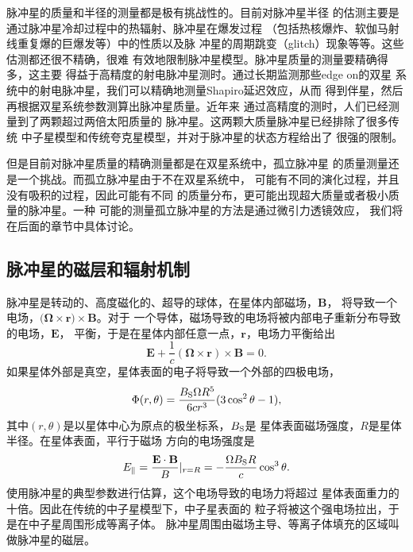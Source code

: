 脉冲星的质量和半径的测量都是极有挑战性的。目前对脉冲星半径
的估测主要是通过脉冲星冷却过程中的热辐射、脉冲星在爆发过程
（包括热核爆炸、软伽马射线重复爆的巨爆发等）中的性质以及脉
冲星的周期跳变（glitch）现象等等。这些估测都还很不精确，很难
有效地限制脉冲星模型。脉冲星质量的测量要精确得多，这主要
得益于高精度的射电脉冲星测时。通过长期监测那些edge on的双星
系统中的射电脉冲星，我们可以精确地测量Shapiro延迟效应，从而
得到伴星，然后再根据双星系统参数测算出脉冲星质量。近年来
通过高精度的测时，人们已经测量到了两颗超过两倍太阳质量的
脉冲星\supercite{Anton,Demorest}。这两颗大质量脉冲星已经排除了很多传统
中子星模型和传统夸克星模型，并对于脉冲星的状态方程给出了
很强的限制\supercite{Ozel2010,Lai2011}。

但是目前对脉冲星质量的精确测量都是在双星系统中，孤立脉冲星
的质量测量还是一个挑战。而孤立脉冲星由于不在双星系统中，
可能有不同的演化过程，并且没有吸积的过程，因此可能有不同
的质量分布，更可能出现超大质量或者极小质量的脉冲星。一种
可能的测量孤立脉冲星的方法是通过微引力透镜效应\supercite{Dai,dsl+15}，
我们将在后面的章节中具体讨论。

\subsection{脉冲星的磁层和辐射机制}

脉冲星是转动的、高度磁化的、超导的球体，在星体内部磁场，$\mathbf{B}$，
将导致一个电场，$(\mathbf{\Omega\times r)\times B}$。对于
一个导体，磁场导致的电场将被内部电子重新分布导致的电场，$\mathbf{E}$，
平衡，于是在星体内部任意一点，$\mathbf{r}$，电场力平衡给出
\begin{equation}
\mathbf{E}+\frac{1}{c}\mathbf{(\Omega\times r)\times B}=0.
\end{equation}
如果星体外部是真空，星体表面的电子将导致一个外部的四极电场，
\begin{equation}
\Phi(r,\theta)=\frac{B_{\rm{S}}\Omega R^{5}}{6cr^{3}}(3\cos^{2}{\theta}-1),
\end{equation}
其中$(r,\theta)$是以星体中心为原点的极坐标系，$B_{\rm{S}}$是
星体表面磁场强度，$R$是星体半径。在星体表面，平行于磁场
方向的电场强度是
\begin{equation}
E_{\parallel}=\frac{\mathbf{E\cdot B}}{B}\arrowvert_{r=R}=-\frac{\Omega B_{\rm{S}}R}{c}\cos^{3}{\theta}.
\end{equation}
使用脉冲星的典型参数进行估算，这个电场导致的电场力将超过
星体表面重力的十倍。因此在传统的中子星模型下，中子星表面的
粒子将被这个强电场拉出，于是在中子星周围形成等离子体。
脉冲星周围由磁场主导、等离子体填充的区域叫做脉冲星的磁层。

